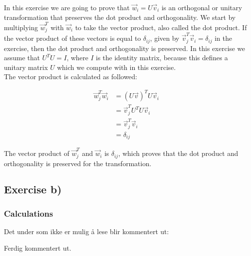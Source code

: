 \documentclass{article}
\begin{document}
In this exercise we are going to prove that $\vec{w}_i = U \vec{v}_i$ is an orthogonal or unitary transformation that preserves the dot product and orthogonality. We start by multiplying $\vec{w}_j ^T$ with $\vec{w}_i$ to take the vector product, also called the dot product. If the vector product of these vectors is equal to $\delta_{ij}$, given by $\vec{v}_j ^T \vec{v}_i = \delta_{ij}$ in the exercise, then the dot product and orthogonality is preserved. In this exercise we assume that $U^T U = I$, where $I$ is the identity matrix, because this defines a unitary matrix $U$ which we compute with in this exercise. \\

The vector product is calculated as followed:

\begin{align*}
  \vec{w}_j ^T \vec{w}_i &= (U \vec{v})^T U \vec{v}_i \\
  &= \vec{v}_j ^T U^T U \vec{v}_i \\
  &= \vec{v}_j ^T \vec{v}_i \\
  &= \delta _{ij}
\end{align*}

The vector product of $\vec{w}_j ^T$ and $\vec{w}_i$ is $\delta_{ij}$, which proves that the dot product and orthogonality is preserved for the transformation.


\subsection{Exercise b)} \label{sec:Method b)}

  \subsubsection{Calculations}

    Det under som ikke er mulig å lese blir kommentert ut:

    \iffalse

    dovkdfv
    fvokdfv
    odkv
    dfvkd
    ofvkdfovkdf

    \fi

    Ferdig kommentert ut.
\end{document}
